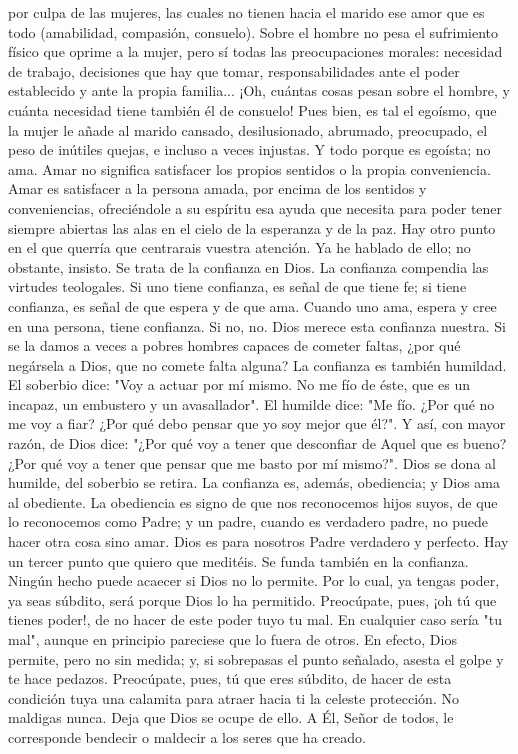 \documentclass[12pt]{book} %
\begin{document}
por culpa de las mujeres, las cuales no tienen hacia el marido ese amor que es todo (amabilidad, compasión, consuelo). Sobre el hombre no pesa el sufrimiento físico que oprime a la mujer, pero sí todas las preocupaciones morales: necesidad de trabajo, decisiones que hay que tomar, responsabilidades ante el poder establecido y ante la propia familia... ¡Oh, cuántas cosas pesan sobre el hombre, y cuánta necesidad tiene también él de consuelo! Pues bien, es tal el egoísmo, que la mujer le añade al marido cansado, desilusionado, abrumado, preocupado, el peso de inútiles quejas, e incluso a veces injustas. Y todo porque es egoísta; no ama. 
Amar no significa satisfacer los propios sentidos o la propia conveniencia. Amar es satisfacer a la persona amada, por 
encima de los sentidos y conveniencias, ofreciéndole a su espíritu esa ayuda que necesita para poder tener siempre abiertas las alas en el cielo de la esperanza y de la paz. 
Hay otro punto en el que querría que centrarais vuestra atención. Ya he hablado de ello; no obstante, insisto. Se trata 
de la confianza en Dios. 
La confianza compendia las virtudes teologales. Si uno tiene confianza, es señal de que tiene fe; si tiene confianza, es 
señal de que espera y de que ama. Cuando uno ama, espera y cree en una persona, tiene confianza. Si no, no. Dios merece esta confianza nuestra. Si se la damos a veces a pobres hombres capaces de cometer faltas, ¿por qué negársela a Dios, que no comete falta alguna? 
La confianza es también humildad. El soberbio dice: "Voy a actuar por mí mismo. No me fío de éste, que es un incapaz, un embustero y un avasallador". El humilde dice: "Me fío. ¿Por qué no me voy a fiar? ¿Por qué debo pensar que yo soy mejor que él?". Y así, con mayor razón, de Dios dice: "¿Por qué voy a tener que desconfiar de Aquel que es bueno? ¿Por qué voy a tener que pensar que me basto por mí mismo?". Dios se dona al humilde, del soberbio se retira. 
La confianza es, además, obediencia; y Dios ama al obediente. La obediencia es signo de que nos reconocemos hijos suyos, de que lo reconocemos como Padre; y un padre, cuando es verdadero padre, no puede hacer otra cosa sino amar. Dios es para nosotros Padre verdadero y perfecto. 
Hay un tercer punto que quiero que meditéis. Se funda también en la confianza. 
Ningún hecho puede acaecer si Dios no lo permite. Por lo cual, ya tengas poder, ya seas súbdito, será porque Dios lo ha 
permitido. Preocúpate, pues, ¡oh tú que tienes poder!, de no hacer de este poder tuyo tu mal. En cualquier caso sería "tu mal", aunque en principio pareciese que lo fuera de otros. En efecto, Dios permite, pero no sin medida; y, si sobrepasas el punto señalado, asesta el golpe y te hace pedazos. Preocúpate, pues, tú que eres súbdito, de hacer de esta condición tuya una calamita para atraer hacia ti la celeste protección. No maldigas nunca. Deja que Dios se ocupe de ello. A Él, Señor de todos, le corresponde bendecir o maldecir a los seres que ha creado. 
 
\end{document}

